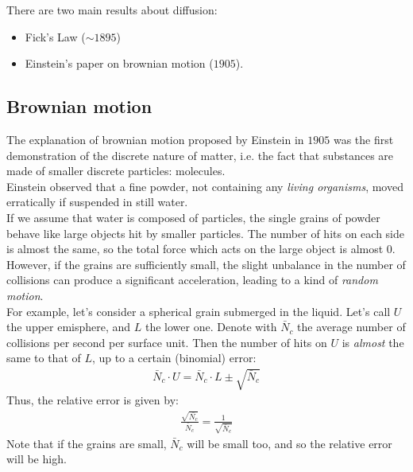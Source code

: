 \documentclass[../template.tex]{subfiles}
\begin{document}
There are two main results about diffusion:
\begin{itemize}
\item Fick's Law ($\sim 1895$)
\item Einstein's paper on brownian motion ($1905$). 
\end{itemize}

\subsection{Brownian motion}
The explanation of brownian motion proposed by Einstein in $1905$ was the first demonstration of the discrete nature of matter, i.e. the fact that substances are made of smaller discrete particles: molecules.\\
Einstein observed that a fine powder, not containing any \textit{living organisms}, moved erratically if suspended in still water.\\

If we assume that water is composed of particles, the single grains of powder behave like large objects hit by smaller particles. The number of hits on each side is almost the same, so the total force which acts on the large object is almost $0$. However, if the grains are sufficiently small, the slight unbalance in the number of collisions can produce a significant acceleration, leading to a kind of \textit{random motion}.\\

For example, let's consider a spherical grain submerged in the liquid. Let's call $U$ the upper emisphere, and $L$ the lower one. Denote with $\bar{N}_c$ the average number of collisions per second per surface unit. Then the number of hits on $U$ is \textit{almost} the same to that of $L$, up to a certain (binomial) error:
\begin{align*}
\bar{N}_c \cdot U = \bar{N}_c \cdot L \pm \sqrt{\bar{N}_c}
\end{align*}
Thus, the relative error is given by:
\begin{align*}
    \frac{\sqrt{\bar{N_c}}}{\bar{N}_c} = \frac{1}{\sqrt{\bar{N}_c}}  
\end{align*}
Note that if the grains are small, $\bar{N}_c$ will be small too, and so the relative error will be high.
\end{document}
